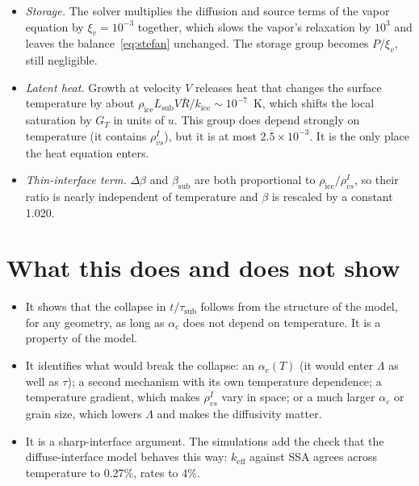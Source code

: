 \documentclass[11pt]{article}
\begin{document}
\begin{itemize}
\item \emph{Storage.} The solver multiplies the diffusion and source terms
  of the vapor equation by $\xi_v = 10^{-3}$ together, which slows the
  vapor's relaxation by $10^{3}$ and leaves the balance~\eqref{eq:stefan}
  unchanged. The storage group becomes $P/\xi_v$, still negligible.
\item \emph{Latent heat.} Growth at velocity $V$ releases heat that changes
  the surface temperature by about $\rho_{\mathrm{ice}} L_{\mathrm{sub}} V
  \bar R / k_{\mathrm{ice}} \sim 10^{-7}$~K, which shifts the local
  saturation by $G_T$ in units of $u$. This group does depend strongly on
  temperature (it contains $\rho_{vs}^{I}$), but it is at most
  $2.5\times10^{-3}$. It is the only place the heat equation enters.
\item \emph{Thin-interface term.} $\Delta\beta$ and $\beta_{\mathrm{sub}}$
  are both proportional to $\rho_{\mathrm{ice}}/\rho_{vs}^{I}$, so their
  ratio is nearly independent of temperature and $\beta$ is rescaled by a
  constant 1.020.
\end{itemize}

\section{What this does and does not show}
\begin{itemize}
\item It shows that the collapse in $t/\tau_{\mathrm{sub}}$ follows from
  the structure of the model, for any geometry, as long as $\alpha_c$ does
  not depend on temperature. It is a property of the model.
\item It identifies what would break the collapse: an $\alpha_c(T)$ (it
  would enter $\Lambda$ as well as $\tau$); a second mechanism with its own
  temperature dependence; a temperature gradient, which makes
  $\rho_{vs}^{I}$ vary in space; or a much larger $\alpha_c$ or grain size,
  which lowers $\Lambda$ and makes the diffusivity matter.
\item It is a sharp-interface argument. The simulations add the check that
  the diffuse-interface model behaves this way: $k_{\mathrm{eff}}$ against
  SSA agrees across temperature to 0.27\%, rates to 4\%.
\end{itemize}
\end{document}
